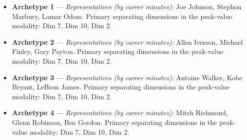 \begin{itemize}
\item \textbf{Archetype 1} --- \emph{Representatives (by career minutes):} Joe Johnson, Stephon Marbury, Lamar Odom. Primary separating dimensions in the peak-value modality: Dim 7, Dim 10, Dim 2.
\item \textbf{Archetype 2} --- \emph{Representatives (by career minutes):} Allen Iverson, Michael Finley, Gary Payton. Primary separating dimensions in the peak-value modality: Dim 7, Dim 10, Dim 2.
\item \textbf{Archetype 3} --- \emph{Representatives (by career minutes):} Antoine Walker, Kobe Bryant, LeBron James. Primary separating dimensions in the peak-value modality: Dim 7, Dim 10, Dim 2.
\item \textbf{Archetype 4} --- \emph{Representatives (by career minutes):} Mitch Richmond, Glenn Robinson, Ben Gordon. Primary separating dimensions in the peak-value modality: Dim 7, Dim 10, Dim 2.
\end{itemize}

